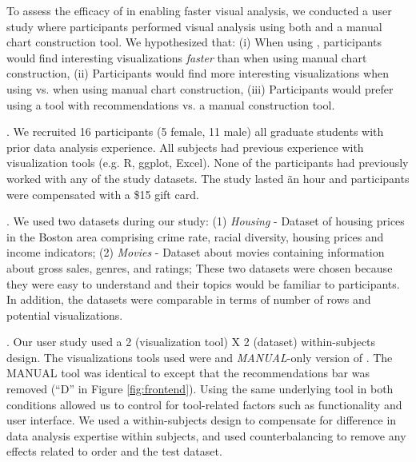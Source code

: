 To assess the efficacy of \SeeDB in enabling faster visual analysis,
we conducted a user study where participants performed visual analysis
using both \SeeDB and a manual chart construction tool.
We hypothesized that: (i) When using \SeeDB, participants would find 
interesting visualizations {\em faster} than when using manual chart
construction, (ii) Participants would find more interesting visualizations
when using \SeeDB vs. when using manual chart construction, (iii) 
Participants would prefer using a tool with recommendations vs. a manual
construction tool.

. We recruited 16 participants (5 female, 11
 male) all graduate students with prior data analysis experience.
 All subjects had previous experience with visualization tools (e.g.
 R, ggplot, Excel).
 None of the participants had previously worked with any of the study datasets.
 The study lasted \~an hour and participants were compensated with a \$15
 gift card.

 . We used two datasets during our study:
 (1) {\em Housing} - Dataset of housing prices in
 the Boston area comprising crime rate, racial diversity, housing prices and
 income indicators; 
 (2) {\em Movies} - Dataset about movies containing information about gross
 sales, genres, and ratings;
 These two datasets were chosen because they were easy to understand and 
 their topics would be familiar to participants. 
 In addition, the datasets were comparable in terms of number of rows and 
 potential visualizations.

.
Our user study used a 2 (visualization tool) X 2 (dataset) 
within-subjects design.
The visualizations tools used were \SeeDB and {\em MANUAL}-only 
version of \SeeDB.
The MANUAL tool was identical to \SeeDB except that the recommendations bar was 
removed (``D'' in Figure \ref{fig:frontend}).
Using the same underlying tool in both conditions allowed us to control for
tool-related factors such as functionality and user interface.
We used a within-subjects design to compensate for difference in data analysis
expertise within subjects, and used counterbalancing to remove any effects 
related to order and the test dataset.

